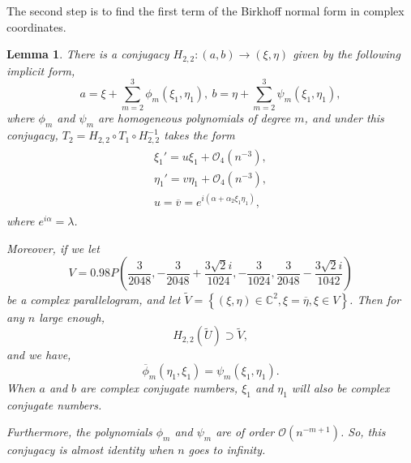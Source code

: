 \documentclass{article}
\numberwithin{figure}{section}
\numberwithin{equation}{section}
\newtheorem{lemma}{Lemma}
\theoremstyle{remark}
\theoremstyle{definition}
\begin{document}
The second step is to find the first term of the Birkhoff normal form in complex coordinates.
\begin{lemma}
	There is a conjugacy $H_{2,2}: (a,b)\rightarrow (\xi, \eta)$ given by the following implicit form,
	\begin{equation}\label{conj_conjugacy}
		a = \xi + \sum_{m = 2}^{3}{\phi_{m}(\xi_1,\eta_1)},\ b = \eta + \sum_{m = 2}^{3}{\psi_{m}(\xi_1,\eta_1)},
	\end{equation}
	where \(\phi_{m}\) and \(\psi_{m}\) are homogeneous polynomials of
	degree \(m\), and under this conjugacy, $T_2=H_{2,2}\circ T_1 \circ H_{2,2}^{-1} $ takes the form
	\begin{align}\label{formBirk}
		\begin{split}
			\xi_1'= u\xi_1 + \mathcal{ O}_4\left( n^{- 3} \right),\\
			\eta_1'= v\eta_1 +\mathcal{ O}_4\left( n^{- 3} \right),\\ 
			u = \overline{v} = e^{i(\alpha + \alpha_{2}\xi_1\eta_1)},
		\end{split}
	\end{align}
	where \(e^{i\alpha} = \lambda\).
	
	Moreover, if we let
	\begin{equation}\label{domain of xi}
		V=0.98P\left(	\frac{3}{2048},  -\frac{3}{2048}+\frac{3\sqrt{2}i}{1024}, -\frac{3}{1024},  \frac{3}{2048}-\frac{3\sqrt{2}i}{1042}\right)
	\end{equation}
	be a complex parallelogram, and let $\widetilde{V}=\left\{(\xi,\eta)\in \mathbb{C}^2, \xi=\overline{\eta},\xi\in V\right\}$.
	Then for any $n$ large enough,
	$$H_{2,2}\left(\widetilde{U}\right)\supset \widetilde{V},$$ and we have,
	\begin{equation}\label{complex_conj}
		{\overline{\phi}}_{m}(\eta_1,\xi_1) = \psi_{m}(\xi_1,\eta_1).
	\end{equation}
	When $a$ and $b$ are complex conjugate numbers, $\xi_1$ and $\eta_1$ will also be complex conjugate numbers.
	
	Furthermore, the polynomials $\phi_m$ and $\psi_m$ are of order $\mathcal{O}(n^{-m+1})$. So, this conjugacy is almost identity when $n$ goes to infinity.
\end{lemma}
\end{document}
